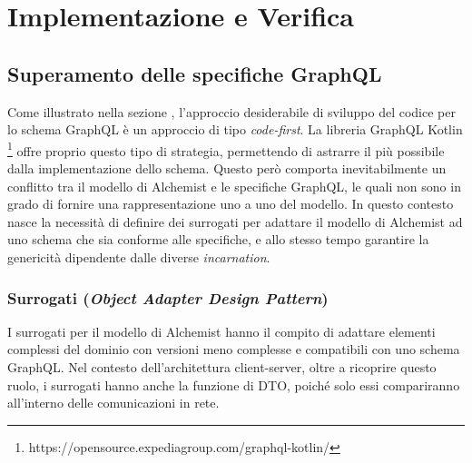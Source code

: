 \chapter{Implementazione e Verifica}\label{chap:implementation}

\section{Superamento delle specifiche GraphQL}\label{sec:overcoming-gql-specs}
Come illustrato nella sezione , l'approccio desiderabile di sviluppo del codice per lo schema GraphQL è un approccio di
tipo \textit{code-first}. La libreria GraphQL Kotlin \footnote{https://opensource.expediagroup.com/graphql-kotlin/} offre proprio questo tipo di
strategia, permettendo di astrarre il più possibile dalla implementazione dello schema. Questo però comporta inevitabilmente un conflitto tra il modello
di Alchemist e le specifiche GraphQL, le quali non sono in grado di fornire una rappresentazione uno a uno del modello.
In questo contesto nasce la necessità di definire dei surrogati per adattare il modello di Alchemist ad uno schema che sia conforme alle specifiche,
e allo stesso tempo garantire la genericità dipendente dalle diverse \textit{incarnation}.

\subsection{Surrogati (\textit{Object Adapter Design Pattern})}\label{ssec:surrogates}
I surrogati per il modello di Alchemist hanno il compito di adattare elementi complessi del dominio con versioni meno complesse e compatibili
con uno schema GraphQL. Nel contesto dell'architettura client-server, oltre a ricoprire questo ruolo,
i surrogati hanno anche la funzione di \ac{DTO}, poiché solo essi compariranno all'interno delle comunicazioni in rete.

